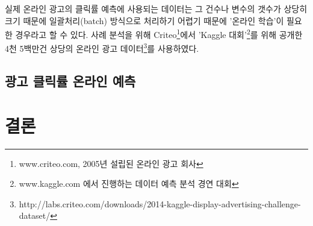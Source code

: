 \documentclass[oneside,b5paper,11pt]{book} %
\begin{document}
 실제 온라인 광고의 클릭률 예측에 사용되는 데이터는 그 건수나 변수의 갯수가 상당히 크기 때문에 일괄처리(batch) 방식으로 처리하기 어렵기 때문에 '온라인 학습'이 필요한 경우라고 할 수 있다. 사례 분석을 위해 Criteo\footnote{www.criteo.com, 2005년 설립된 온라인 광고 회사}에서 'Kaggle 대회'\footnote{www.kaggle.com 에서 진행하는 데이터 예측 분석 경연 대회}를 위해 공개한 4천 5백만건 상당의 온라인 광고 데이터\footnote{http://labs.criteo.com/downloads/2014-kaggle-display-advertising-challenge-dataset/}를 사용하였다.
   
\section{광고 클릭률 온라인 예측}

%
%
\chapter{결론}














%
%


\end{document}
